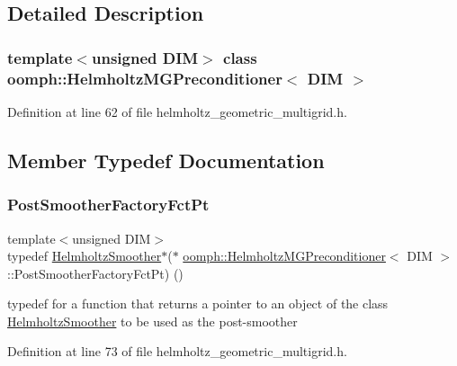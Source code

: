 \subsection{Detailed Description}
\subsubsection*{template$<$unsigned D\+IM$>$\newline
class oomph\+::\+Helmholtz\+M\+G\+Preconditioner$<$ D\+I\+M $>$}



Definition at line 62 of file helmholtz\+\_\+geometric\+\_\+multigrid.\+h.



\subsection{Member Typedef Documentation}
\mbox{\label{classoomph_1_1HelmholtzMGPreconditioner_a3405bc1f75c5e1e83601cd9b0e02634b}} 
\subsubsection{\texorpdfstring{Post\+Smoother\+Factory\+Fct\+Pt}{PostSmootherFactoryFctPt}}
{\footnotesize\ttfamily template$<$unsigned D\+IM$>$ \\
typedef \hyperlink{classoomph_1_1HelmholtzSmoother}{Helmholtz\+Smoother}$\ast$($\ast$ \hyperlink{classoomph_1_1HelmholtzMGPreconditioner}{oomph\+::\+Helmholtz\+M\+G\+Preconditioner}$<$ D\+IM $>$\+::Post\+Smoother\+Factory\+Fct\+Pt) ()}



typedef for a function that returns a pointer to an object of the class \hyperlink{classoomph_1_1HelmholtzSmoother}{Helmholtz\+Smoother} to be used as the post-\/smoother 



Definition at line 73 of file helmholtz\+\_\+geometric\+\_\+multigrid.\+h.

\mbox{\label{classoomph_1_1HelmholtzMGPreconditioner_ac17ab35f36cad29ce8f1e64593c90a95}} 
